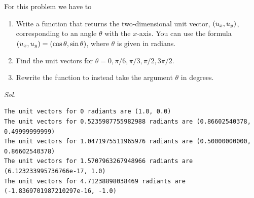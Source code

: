     \begin{problem}\label{problem_2.4}
        For this problem we have to
        \begin{enumerate}
            \item Write a function that returns the two-dimensional unit vector, $\qty(u_x,u_y)$, corresponding to an angle $\theta$ with the $x$-axis. You can use the formula $\qty(u_x,u_y)=\qty(\cos{\theta},\sin{\theta})$, where $\theta$ is given in radians.
            \item Find the unit vectors for $\theta = 0, \pi/6, \pi/3, \pi/2, 3\pi/2$.
            \item Rewrite the function to instead take the argument $\theta$ in degrees.
        \end{enumerate}
    \end{problem}
    \textit{ Sol. } 
    
    \begin{verbatim}
The unit vectors for 0 radiants are (1.0, 0.0)
The unit vectors for 0.5235987755982988 radiants are (0.86602540378, 0.49999999999)
The unit vectors for 1.0471975511965976 radiants are (0.50000000000, 0.86602540378)
The unit vectors for 1.5707963267948966 radiants are (6.123233995736766e-17, 1.0)
The unit vectors for 4.71238898038469 radiants are (-1.8369701987210297e-16, -1.0)
    \end{verbatim}



